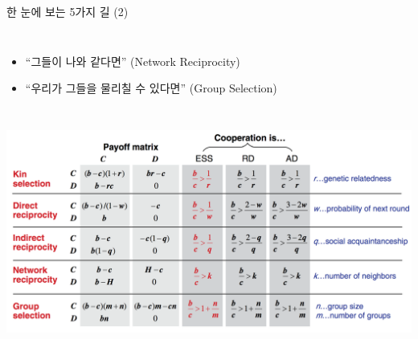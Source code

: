 \documentclass[final]{beamer}
\begin{document}
\begin{frame}[t]{한 눈에 보는 5가지 길 (2)}
	\begin{columns}[c]
	\column{10em}
	\column{20em}
	\vspace{0em}
	\begin{itemize}
	\item ``그들이 나와 같다면'' (Network Reciprocity)\\[8em]
	\item ``우리가 그들을 물리칠 수 있다면'' (Group Selection)
	\end{itemize}
	\end{columns}
\end{frame}

\begin{frame}
  \includegraphics[width=\textwidth]{fiverule.png}
\end{frame}
\end{document}
